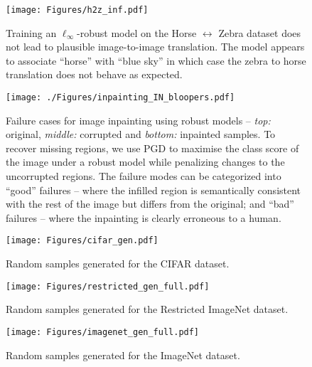 \documentclass{article}
\newcommand{\HtoZ}{Horse $\leftrightarrow$ Zebra}
\begin{document}
{\begin{figure}[!h]
\begin{center}
    \texttt{[image: Figures/h2z\_inf.pdf]}
\end{center}
\caption{Training an $\ell_\infty$-robust model on the {\HtoZ} dataset does not
lead to plausible image-to-image translation. The model appears to associate
``horse'' with ``blue sky'' in which case the zebra to horse translation does
not behave as expected.}
\label{fig:fail_sky}
\end{figure}

\begin{figure}[!ht]
	\centering
	\texttt{[image: ./Figures/inpainting\_IN\_bloopers.pdf]}
	\caption{Failure cases for image inpainting using robust models -- 
		\textit{top:} original, \textit{middle:} corrupted and \textit{bottom:} 
		inpainted samples. To recover 
		missing regions, we use PGD to maximise the class score of 
		the image under a robust model while penalizing changes to 
		the uncorrupted regions. The failure modes can be categorized
	    into ``good'' failures -- where the infilled region is semantically
        consistent with the rest of the image but differs from the original;
       and ``bad'' failures --  where the inpainting is clearly erroneous to
       a human.}
	\label{fig:inpainting_bloopers}
\end{figure}

\begin{figure}[!htp]
\begin{center}
    \texttt{[image: Figures/cifar\_gen.pdf]}
\end{center}
\caption{Random samples generated for the CIFAR dataset.}
\label{fig:CIFAR_gen_full}
\end{figure}

\begin{figure}[!htp]
\begin{center}
    \texttt{[image: Figures/restricted\_gen\_full.pdf]}
\end{center}
\caption{Random samples generated for the Restricted ImageNet dataset.}
\label{fig:restricted_gen_full}
\end{figure}

\begin{figure}[!htp]
\begin{center}
    \texttt{[image: Figures/imagenet\_gen\_full.pdf]}
\end{center}
\caption{Random samples generated for the ImageNet dataset.}
\label{fig:imagenet_gen_full}
\end{figure}

}
\end{document}

